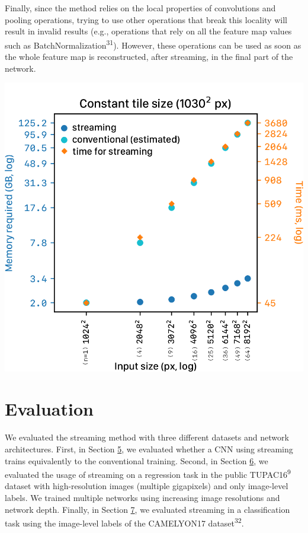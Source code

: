 \documentclass[
  12pt,
  a5,margin=2cmpaper,
]{article}
\begin{document}
Finally, since the method relies on the local properties of convolutions
and pooling operations, trying to use other operations that break this
locality will result in invalid results (e.g., operations that rely on
all the feature map values such as
BatchNormalization\textsuperscript{31}). However, these operations can
be used as soon as the whole feature map is reconstructed, after
streaming, in the final part of the network.

\includegraphics{chpt2_imgs/constant_tile_size.png}\\

\hypertarget{evaluation}{%
\section{Evaluation}\label{evaluation}}

We evaluated the streaming method with three different datasets and
network architectures. First, in Section
\protect\hyperlink{section:imagenette}{5}, we evaluated whether a CNN
using streaming trains equivalently to the conventional training.
Second, in Section \protect\hyperlink{section:tupac}{6}, we evaluated
the usage of streaming on a regression task in the public
TUPAC16\textsuperscript{9} dataset with high-resolution images (multiple
gigapixels) and only image-level labels. We trained multiple networks
using increasing image resolutions and network depth. Finally, in
Section \protect\hyperlink{section:camyleon}{7}, we evaluated streaming
in a classification task using the image-level labels of the CAMELYON17
dataset\textsuperscript{32}.
\end{document}
